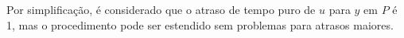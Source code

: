 \documentclass[12pt,a4paper,titlepage]{book}
\theoremstyle{definition}
\theoremstyle{plain}
\theoremstyle{definition}
\theoremstyle{remark}
\begin{document}
Por simplificação, é considerado que o atraso de tempo puro de $u$ para $y$ em $P$ é 1, mas o procedimento pode ser estendido sem problemas para atrasos maiores.
\end{document}
